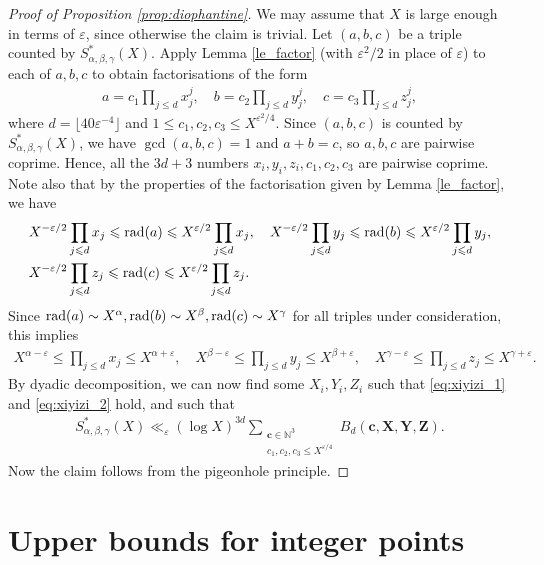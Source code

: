 \begin{proof}[Proof of Proposition \ref{prop:diophantine}] We may assume that $X$ is large enough in terms of $\varepsilon$, since otherwise the claim is trivial. Let $(a,b,c)$ be a triple counted by $S^*_{\alpha,\beta,\gamma}(X)$. Apply Lemma \ref{le_factor} (with $\varepsilon^2/2$ in place of $\varepsilon$) to each of $a,b,c$ to obtain factorisations of the form
\begin{align*}
a=c_1\prod_{j\leq d}x_j^j,\quad b=c_2\prod_{j\leq d}y_j^j,\quad c=c_3\prod_{j\leq d}z_j^j,
\end{align*}
where $d=\lfloor 40\varepsilon^{-4}\rfloor$ and $1\leq c_1,c_2,c_3\leq X^{\varepsilon^2/4}$. Since $(a,b,c)$ is counted by $S^*_{\alpha,\beta,\gamma}(X)$, we have $\gcd(a,b,c)=1$ and $a+b=c$, so $a,b,c$ are pairwise coprime. Hence, all the $3d+3$ numbers $x_i,y_i,z_i,c_1,c_2,c_3$ are pairwise coprime. Note also that by the properties of the factorisation given by Lemma \ref{le_factor}, we have
\begin{align*}
&X^{-\varepsilon/2}\prod_{j\leqslant d}x_j\leqslant \operatorname{rad}(a)\leqslant X^{\varepsilon/2}\prod_{j\leqslant d}x_j,\quad X^{-\varepsilon/2}\prod_{j\leqslant d}y_j\leqslant \operatorname{rad}(b)\leqslant  X^{\varepsilon/2}\prod_{j\leqslant d}y_j,\\
&X^{-\varepsilon/2}\prod_{j\leqslant d}z_j\leqslant \operatorname{rad}(c)\leqslant X^{\varepsilon/2}\prod_{j\leqslant d}z_j.
\end{align*}
Since $\operatorname{rad}(a)\sim X^{\alpha},\operatorname{rad}(b)\sim X^{\beta},\operatorname{rad}(c)\sim X^{\gamma}$ for all triples under consideration, this implies
\begin{align*}
X^{\alpha-\varepsilon}\leq \prod_{j\leq d}x_j\leq X^{\alpha+\varepsilon},\quad  X^{\beta-\varepsilon}\leq \prod_{j\leq d}y_j\leq X^{\beta+\varepsilon},\quad  X^{\gamma-\varepsilon}\leq \prod_{j\leq d}z_j\leq X^{\gamma+\varepsilon}.
\end{align*}
By dyadic decomposition, we can now find some $X_i, Y_i,Z_i$ such that \eqref{eq:xiyizi_1}
and \eqref{eq:xiyizi_2}
 hold,  and such that
\begin{align*}
S^*_{\alpha,\beta,\gamma}(X)\ll_{\varepsilon} (\log X)^{3d} \sum_{\substack{\mathbf{c}\in \mathbb{N}^3\\
c_1,c_2,c_3
\leq X^{\varepsilon/4}}}B_d(\mathbf{c},\mathbf{X},\mathbf{Y},\mathbf{Z}).
\end{align*}
Now the claim follows from the pigeonhole principle.
\end{proof}



\section{Upper bounds for integer points}

